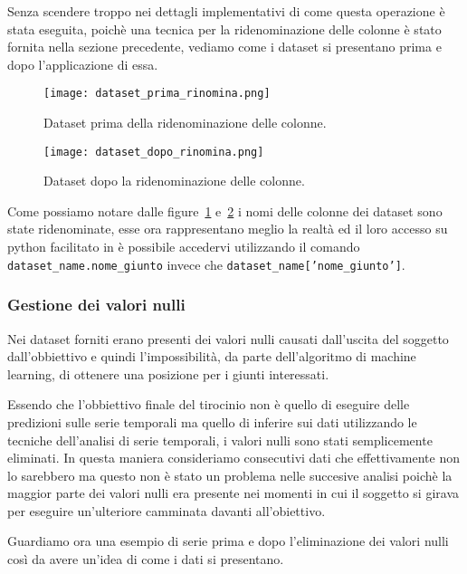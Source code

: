 Senza scendere troppo nei dettagli implementativi di come questa operazione è stata eseguita,
poichè una tecnica per la ridenominazione delle colonne è stato fornita nella sezione precedente,
vediamo come i dataset si presentano prima e dopo l'applicazione di essa.

\begin{figure}[H]
    \centering
    \texttt{[image: dataset\_prima\_rinomina.png]}
    \caption{Dataset prima della ridenominazione delle colonne.}
    \label{fig:ds_prima_rinomina}
\end{figure}

\begin{figure}[H]
    \centering
    \texttt{[image: dataset\_dopo\_rinomina.png]}
    \caption{Dataset dopo la ridenominazione delle colonne.}
    \label{fig:ds_dopo_rinomina}
\end{figure}

Come possiamo notare dalle figure~\ref*{fig:ds_prima_rinomina} e~\ref*{fig:ds_dopo_rinomina}
i nomi delle colonne dei dataset sono state ridenominate, esse ora rappresentano meglio
la realtà ed il loro accesso su python facilitato in è possibile accedervi utilizzando
il comando \texttt{dataset\_name.nome\_giunto} invece che \texttt{dataset\_name['nome\_giunto']}.



\subsubsection{Gestione dei valori nulli}
Nei dataset forniti erano presenti dei valori nulli causati
dall'uscita del soggetto dall'obbiettivo e quindi l'impossibilità, da parte dell'algoritmo
di machine learning, di ottenere una posizione per i giunti interessati.

Essendo che l'obbiettivo finale del tirocinio non è quello di eseguire delle predizioni
sulle serie temporali ma quello di inferire sui dati utilizzando le tecniche
dell'analisi di serie temporali, i valori nulli sono stati semplicemente eliminati.
In questa maniera consideriamo consecutivi dati che effettivamente non lo sarebbero
ma questo non è stato un problema nelle succesive analisi poichè la maggior parte dei 
valori nulli era presente nei momenti in cui il soggetto si girava per eseguire un'ulteriore
camminata davanti all'obiettivo.

Guardiamo ora una esempio di serie prima e dopo l'eliminazione dei valori nulli così da avere
un'idea di come i dati si presentano.

